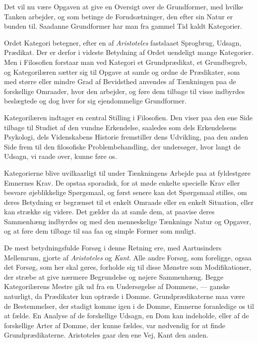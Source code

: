 \documentclass[12pt,a4paper]{book}
\newcommand{\apage}[1]{\marginnote{\footnotesize\textit{[#1]}}}
\begin{document}
Det vil nu være Opgaven at give en Oversigt over de Grundformer, med
hvilke Tanken arbejder, og som betinge de Forudsætninger, den efter sin
Natur er bunden til. Saadanne Grundformer har man fra gammel Tid kaldt
Kategorier.

Ordet Kategori betegner, efter en af \emph{Aristoteles} fastslaaet
Sprogbrug, Udsagn, Prædikat. Der er derfor i videste Betydning af Ordet
uendeligt mange Kategorier. Men i Filosofien forstaar man ved Kategori et
Grundprædikat, et Grundbegreb, og Kategorilæren sætter sig til Opgave at
samle og ordne de Prædikater, som med større eller mindre Grad af
Bevidsthed anvendes af Tænkningen paa de forskellige Omraader, hvor den
arbejder, og føre dem tilbage til visse \apage{136} indbyrdes beslægtede og dog hver
for sig ejendommelige Grundformer.

Kategorilæren indtager en central Stilling i Filosofien. Den viser paa
den ene Side tilbage til Studiet af den vundne Erkendelse, saaledes som
dels Erkendelsens Psykologi, dels Videnskabens Historie fremstiller dens Udvikling, paa den anden Side frem til den filosofiske
Problembehandling, der undersøger, hvor langt de Udsagn, vi raade over,
kunne føre os.

Kategorierne blive uvilkaarligt til under Tænkningens Arbejde paa at
fyldestgøre Emnernes Krav. De opstaa sporadisk, for at møde enkelte
specielle Krav eller besvare øjeblikkelige Spørgsmaal, og først senere
kan det Spørgsmaal stilles, om deres Betydning er begrænset til et enkelt
Omraade eller en enkelt Situation, eller kan strække sig videre. Det
gælder da at samle dem, at paavise deres Sammenhæng indbyrdes og med den
menneskelige Tænknings Natur og Opgaver, og at føre dem tilbage til saa
faa og simple Former som muligt.

De mest betydningsfulde Forsøg i denne Retning ere, med Aartusinders
Mellemrum, gjorte af \emph{Aristoteles} og \emph{Kant}. Alle andre
Forsøg, som foreligge, ogsaa det Forsøg, som her skal gøres, forholde
sig til disse Mønstre som Modifikationer, der stræbe at give nærmere
Begrundelse og nøjere Sammenhæng. Begge Kategorilærens Mestre gik ud fra
en Undersøgelse af Dommene, --- ganske naturligt, da Prædikater kun
optræde i Domme. Grundprædikaterne maa være de Bestemmelser, der stadigt
komme igen i de Domme, Emnerne foranledige os til at fælde. En Analyse af
de forskellige Udsagn, en Dom kan indeholde, eller af de forskellige
Arter af Domme, der kunne fældes, var nødvendig for at finde
Grundprædikaterne. Aristoteles gaar den ene Vej, Kant den anden.
\end{document}
